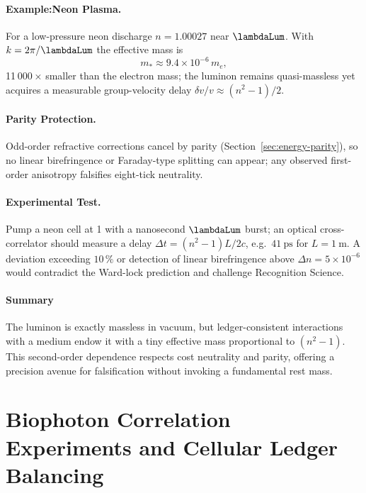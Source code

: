 \documentclass[11pt,oneside]{book}
\begin{document}
{\paragraph{Example:\;Neon Plasma.}
For a low-pressure neon discharge \(n\!=\!1.00027\) near
\(\lambdaLum\).  
With \(k=2\pi/\lambdaLum\) the effective mass is
\[
   m_{\!*}\approx
   9.4\times10^{-6}\,m_{e},
\]
11 000 × smaller than the electron mass; the luminon remains
quasi-massless yet acquires a measurable group-velocity delay
\(\delta v/v\approx(n^{2}-1)/2\).

\paragraph{Parity Protection.}
Odd-order refractive corrections cancel by parity
(Section~\ref{sec:energy-parity}), so no linear birefringence or
Faraday-type splitting can appear; any observed first-order
anisotropy falsifies eight-tick neutrality.

\paragraph{Experimental Test.}
Pump a neon cell at \SI{1}{\torr} with a nanosecond
\(\lambdaLum\) burst; an optical cross-correlator should measure
a delay
\(\Delta t = (n^{2}-1)L/2c\),
e.g.\ \(\SI{41}{\pico\second}\) for \(L=\SI{1}{\metre}\).
A deviation exceeding \(10\,\%\) or detection of linear
birefringence above \(\Delta n=5\times10^{-6}\) would
contradict the Ward-lock prediction and challenge Recognition Science.

\paragraph*{Summary}

The luminon is exactly massless in vacuum, but
ledger-consistent interactions with a medium endow it with a tiny
effective mass proportional to \((n^{2}-1)\).  
This second-order dependence respects cost neutrality and parity,
offering a precision avenue for falsification without invoking
a fundamental rest mass.


\section{Biophoton Correlation Experiments and Cellular Ledger Balancing}
\label{sec:biophoton-corr}

}
\end{document}
